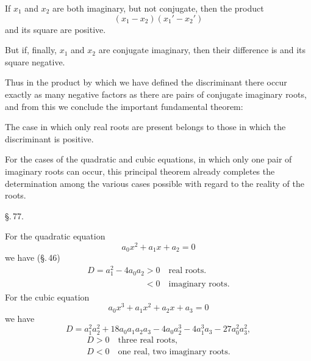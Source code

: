 If $x_1$ and $x_2$ are both imaginary, but not conjugate, then the product
\[
(x_1 - x_2)(x_1' - x_2')
\]
and its square are positive.

But if, finally, $x_1$ and $x_2$ are conjugate imaginary, then their difference is  and its square negative.

Thus in the product by which we have defined the discriminant there occur exactly as many negative factors as there are pairs of conjugate imaginary roots, and from this we conclude the important fundamental theorem:


The case in which only real roots are present belongs to those in which the discriminant is positive.

For the cases of the quadratic and cubic equations, in which only one pair of imaginary roots can occur, this principal theorem already completes the determination among the various cases possible with regard to the reality of the roots.

\begin{center}
\S.\,77.

\end{center}

For the quadratic equation
\[
a_0 x^2 + a_1 x + a_2 = 0
\]
we have (\S.\,46)
\[
\begin{array}{l}
D = a_1^2 - 4a_0a_2 > 0 \quad \text{real roots.}\\
\phantom{D = a_1^2 - 4a_0a_2 } < 0 \quad \text{imaginary roots.}
\end{array}
\]
For the cubic equation
\[
a_0 x^3 + a_1 x^2 + a_2 x + a_3 = 0
\]
we have
\[
D = a_1^2a_2^2 + 18a_0a_1a_2a_3 - 4a_0a_2^3 - 4a_1^3a_3 - 27a_0^2a_3^2,
\]
\[
\begin{array}{l}
D > 0 \quad \text{three real roots,}\\
D < 0 \quad \text{one real, two imaginary roots.}
\end{array}
\]
